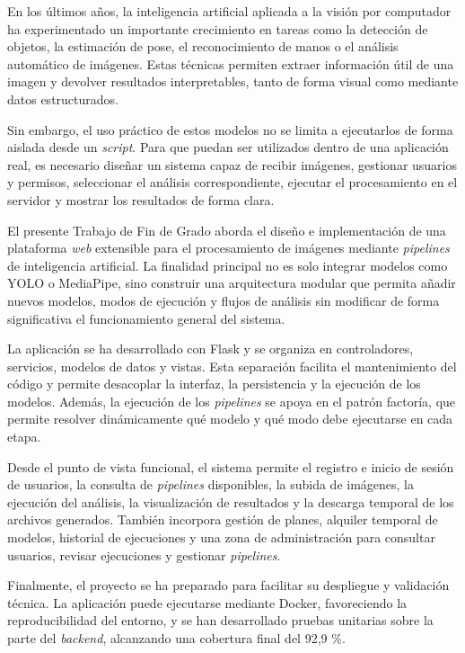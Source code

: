 
En los últimos años, la inteligencia artificial aplicada a la visión por computador ha experimentado un importante crecimiento en tareas como la detección de objetos, la estimación de pose, el reconocimiento de manos o el análisis automático de imágenes. Estas técnicas permiten extraer información útil de una imagen y devolver resultados interpretables, tanto de forma visual como mediante datos estructurados.

Sin embargo, el uso práctico de estos modelos no se limita a ejecutarlos de forma aislada desde un \textit{script}. Para que puedan ser utilizados dentro de una aplicación real, es necesario diseñar un sistema capaz de recibir imágenes, gestionar usuarios y permisos, seleccionar el análisis correspondiente, ejecutar el procesamiento en el servidor y mostrar los resultados de forma clara.

El presente Trabajo de Fin de Grado aborda el diseño e implementación de una plataforma \textit{web} extensible para el procesamiento de imágenes mediante \textit{pipelines} de inteligencia artificial. La finalidad principal no es solo integrar modelos como YOLO o MediaPipe, sino construir una arquitectura modular que permita añadir nuevos modelos, modos de ejecución y flujos de análisis sin modificar de forma significativa el funcionamiento general del sistema.

La aplicación se ha desarrollado con Flask y se organiza en controladores, servicios, modelos de datos y vistas. Esta separación facilita el mantenimiento del código y permite desacoplar la interfaz, la persistencia y la ejecución de los modelos. Además, la ejecución de los \textit{pipelines} se apoya en el patrón factoría, que permite resolver dinámicamente qué modelo y qué modo debe ejecutarse en cada etapa.

Desde el punto de vista funcional, el sistema permite el registro e inicio de sesión de usuarios, la consulta de \textit{pipelines} disponibles, la subida de imágenes, la ejecución del análisis, la visualización de resultados y la descarga temporal de los archivos generados. También incorpora gestión de planes, alquiler temporal de modelos, historial de ejecuciones y una zona de administración para consultar usuarios, revisar ejecuciones y gestionar \textit{pipelines}.

Finalmente, el proyecto se ha preparado para facilitar su despliegue y validación técnica. La aplicación puede ejecutarse mediante Docker, favoreciendo la reproducibilidad del entorno, y se han desarrollado pruebas unitarias sobre la parte del \textit{backend}, alcanzando una cobertura final del 92,9 \%.

